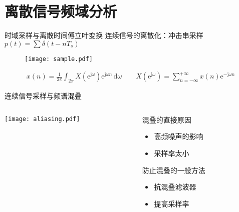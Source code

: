 \documentclass[UTF8]{ctexbeamer}
\begin{document}
\section{离散信号频域分析}


\begin{frame}{时域采样与离散时间傅立叶变换}
    连续信号的离散化：冲击串采样 $p(t) = \sum \delta (t - n T_s) $

    \begin{figure}
        \centering
        \texttt{[image: sample.pdf]}
    \end{figure}
    \vspace{\fill}
    \begin{tcolorbox}[top=0mm,
        title = 离散时间傅立叶变换（Discrete-Time Fourier Transform）,
        boxrule = 0.3pt,
        fontupper = \normalcolor\small]
        \begin{gather*}
            x(n) = \frac{1}{2\pi} \int_{2\pi} X(\mathrm{e}^{\mathrm{j}\omega}) \mathrm{e}^{\mathrm{j}\omega n}\,\mathrm{d}\omega 
            \qquad
            X(\mathrm{e}^{\mathrm{j}\omega}) = \sum_{n=-\infty}^{+\infty} x(n) \mathrm{e}^{-\mathrm{j}\omega n}            
        \end{gather*}
    \end{tcolorbox}
\end{frame}


\begin{frame}{连续信号采样与频谱混叠}
    \begin{columns}
        \begin{column}{0.55\textwidth}
            \centering
            \texttt{[image: aliasing.pdf]}
        \end{column}
        \begin{column}{0.4\textwidth}
            混叠的直接原因
            \begin{itemize}
                \item 高频噪声的影响
                \item 采样率太小
            \end{itemize}

            防止混叠的一般方法
            \begin{itemize}
                \item 抗混叠滤波器
                \item 提高采样率
            \end{itemize}
        \end{column}
    \end{columns}
\end{frame}
\end{document}
